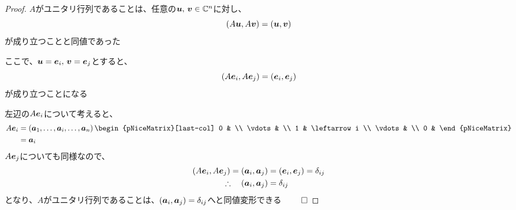 \documentclass[../../../topic_linear-algebra]{subfiles}
\begin{document}
\begin{proof}
  $A$がユニタリ行列であることは、任意の$\vb*{u},\,\vb*{v} \in \mathbb{C}^n$に対し、
  \begin{equation*}
    (A\vb*{u}, A\vb*{v}) = (\vb*{u}, \vb*{v})
  \end{equation*}
  が成り立つことと同値であった

  ここで、$\vb*{u} = \vb*{e}_i,\, \vb*{v} = \vb*{e}_j$とすると、
  \begin{equation*}
    (A\vb*{e}_i, A\vb*{e}_j) = (\vb*{e}_i, \vb*{e}_j)
  \end{equation*}
  が成り立つことになる

  \br

  左辺の$A\vb*{e}_i$について考えると、
  \begin{align*}
    A\vb*{e}_i & = \left( \vb*{a}_1, \ldots, \vb*{a}_i, \ldots, \vb*{a}_n \right)
    \begin{pNiceMatrix}[last-col]
      0      &              \\
      \vdots &              \\
      1      & \leftarrow i \\
      \vdots &              \\
      0      &
    \end{pNiceMatrix}                                                  \\
               & = \vb*{a}_i
  \end{align*}
  $A\vb*{e}_j$についても同様なので、
  \begin{align*}
    (A\vb*{e}_i, A\vb*{e}_j) = (\vb*{a}_i, \vb*{a}_j) & = (\vb*{e}_i, \vb*{e}_j) = \delta_{ij} \\
    \therefore \quad (\vb*{a}_i, \vb*{a}_j)           & = \delta_{ij}
  \end{align*}
  となり、$A$がユニタリ行列であることは、$(\vb*{a}_i, \vb*{a}_j) = \delta_{ij}$へと同値変形できる $\qed$
\end{proof}
\end{document}
